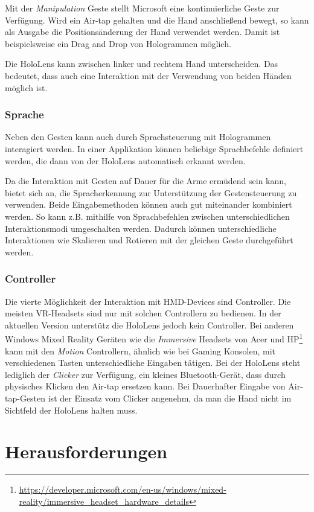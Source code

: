 Mit der \textit{Manipulation} Geste stellt Microsoft eine kontinuierliche Geste zur Verfügung. Wird ein Air-tap gehalten und die Hand anschließend bewegt, so kann als Ausgabe die Positionsänderung der Hand verwendet werden. Damit ist beispielsweise ein Drag and Drop von Hologrammen möglich.

Die HoloLens kann zwischen linker und rechtem Hand unterscheiden. Das bedeutet, dass auch eine Interaktion mit der Verwendung von beiden Händen möglich ist.

\subsubsection*{Sprache}
Neben den Gesten kann auch durch Sprachsteuerung mit Hologrammen interagiert werden. In einer Applikation können beliebige Sprachbefehle definiert werden, die dann von der HoloLens automatisch erkannt werden.

Da die Interaktion mit Gesten auf Dauer für die Arme ermüdend sein kann, bietet sich an, die Spracherkennung zur Unterstützung der Gestensteuerung zu verwenden. Beide Eingabemethoden können auch gut miteinander kombiniert werden. So kann z.B. mithilfe von Sprachbefehlen zwischen unterschiedlichen Interaktionsmodi umgeschalten werden. Dadurch können unterschiedliche Interaktionen wie Skalieren und Rotieren mit der gleichen Geste durchgeführt werden.

\subsubsection*{Controller}
Die vierte Möglichkeit der Interaktion mit HMD-Devices sind Controller. Die meisten VR-Headsets sind nur mit solchen Controllern zu bedienen. In der aktuellen Version unterstütz die HoloLens jedoch kein Controller. Bei anderen Windows Mixed Reality Geräten wie die \textit{Immersive} Headsets von Acer und HP\footnote{\url{https://developer.microsoft.com/en-us/windows/mixed-reality/immersive_headset_hardware_details}} kann mit den \textit{Motion} Controllern, ähnlich wie bei Gaming Konsolen, mit verschiedenen Tasten unterschiedliche Eingaben tätigen. Bei der HoloLens steht lediglich der \textit{Clicker} zur Verfügung, ein kleines Bluetooth-Gerät, dass durch physisches Klicken den Air-tap ersetzen kann. Bei Dauerhafter Eingabe von Air-tap-Gesten ist der Einsatz vom Clicker angenehm, da man die Hand nicht im Sichtfeld der HoloLens halten muss.

\section{Herausforderungen}


